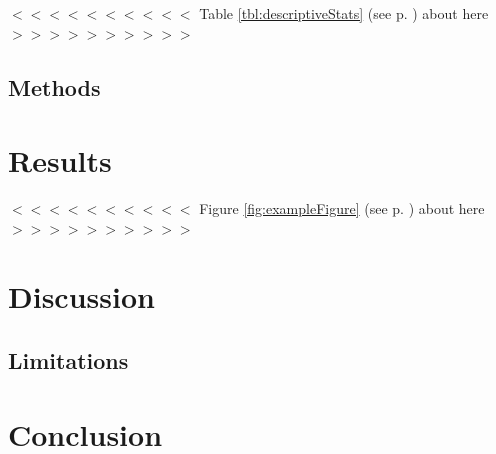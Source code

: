 \documentclass[12pt]{article}
\begin{document}
\begin{doublespace}
\begin{center}
$<<<<<<<<<<$ Table \ref{tbl:descriptiveStats} (see p. \pageref{tbl:descriptiveStats}) about here $>>>>>>>>>>$
\end{center}

\vspace{3mm}
\subsection*{Methods}
\lipsum[14-16]

\vspace{5mm}
\section*{Results}
\lipsum[17-19]

\begin{center}
$<<<<<<<<<<$ Figure \ref{fig:exampleFigure} (see p. \pageref{fig:exampleFigure}) about here $>>>>>>>>>>$
\end{center}

\lipsum[20]

\vspace{5mm}
\section*{Discussion}
\lipsum[21-22]

\vspace{3mm}
\subsection*{Limitations}
\lipsum[23]

\vspace{5mm}
\section*{Conclusion}
\lipsum[24]


\end{doublespace}


\newpage

\theendnotes


\newpage
\end{document}
